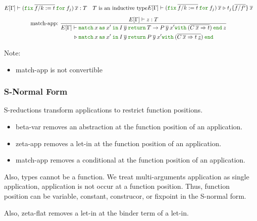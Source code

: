 \documentclass[a4paper,fleqn]{article}
\newcommand{\kwin}{\mbox{\color{mygreen}\ttfamily in}}
\newcommand{\kwmatch}{\mbox{\color{mygreen}\ttfamily match}}
\newcommand{\kwas}{\mbox{\color{mygreen}\ttfamily as}}
\newcommand{\kwreturn}{\mbox{\color{mygreen}\ttfamily return}}
\newcommand{\kwwith}{\mbox{\color{mygreen}\ttfamily with}}
\newcommand{\kwend}{\mbox{\color{mygreen}\ttfamily end}}
\newcommand{\kwfix}{\mbox{\color{mygreen}\ttfamily fix}}
\newcommand{\kwfor}{\mbox{\color{mygreen}\ttfamily for}}
\newcommand{\ofix}[2]{\kwfix\:{#1}\:\kwfor\:{#2}}
\newcommand{\breakrule}{\\[0.5em]}
\newcommand{\substm}[3]{#1\{\overline{#2/#3}\}}
\newcommand{\reltri}{\mathrel{\triangleright}}
\begin{document}
\begin{gather*}
{\begin{gathered}
        E[\Gamma] \vdash (\ofix{\overline{f/k:=t}}{f_j})\:\overline{x} : T \quad
        \text{$T$ is an inductive type}
      \end{gathered}
    }{
      E[\Gamma] \vdash
      (\ofix{\overline{f/k:=t}}{f_j})\:\overline{x}
      \reltri
      \substm{t_j}{f}{f'} \:\overline{x}
    } \breakrule
  \text{match-app:}~
    \dfrac
    {
      E[\Gamma] \vdash z : T
    }{
      \begin{aligned}
        E[\Gamma] \vdash\; &
          \kwmatch\:x\:
          \kwas\:x'\:
          \kwin\:I\:\overline{y}\:
          \kwreturn\:{T \rightarrow P\:\overline{y}\:x'}
          \kwwith\:(\overline{{C\: \overline{x}} \Rightarrow {t}})\:
          \kwend\:z \\
        \reltri\; &
          \kwmatch\:x\:
          \kwas\:x'\:
          \kwin\:I\:\overline{y}\:
          \kwreturn\:{P\:\overline{y}\:x'}
          \kwwith\:(\overline{{C\: \overline{x}} \Rightarrow {t\:\underline{z}}})\:
          \kwend
      \end{aligned}
    }
\end{gather*}

{\small Note:
\begin{itemize}
  \item match-app is not convertible
\end{itemize}}

\subsubsection{S-Normal Form}\label{sec:s-normal-form}
S-reductions transform applications to restrict function positions.
\begin{itemize}
  \item beta-var removes an abstraction at the function position of an application.
  \item zeta-app removes a let-in at the function position of an application.
  \item match-app removes a conditional at the function position of an application.
\end{itemize}
Also, types cannot be a function.
We treat multi-arguments application as single application, application is not occur at a function position.
Thus, function position can be variable, constant, construcor, or fixpoint in the S-normal form.

Also, zeta-flat removes a let-in at the binder term of a let-in.
\end{document}
